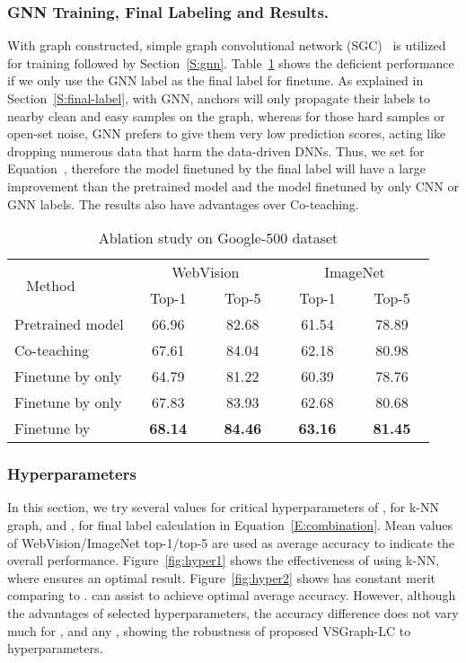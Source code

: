 \documentclass[sigconf]{acmart}
\begin{document}
\subsubsection{GNN Training, Final Labeling and Results.}
With graph  constructed, simple graph convolutional network (SGC)~\cite{wu2019simplifying} is utilized for training followed by Section~\ref{S:gnn}. Table~\ref{tab:google500} shows the deficient performance if we only use the GNN label as the final label for finetune. As explained in Section~\ref{S:final-label}, with GNN, anchors will only propagate their labels to nearby clean and easy samples on the graph, whereas for those hard samples or open-set noise, GNN prefers to give them very low prediction scores, acting like dropping numerous data that harm the data-driven DNNs. Thus, we set  for Equation~, therefore the model finetuned by the final label will have a large improvement than the pretrained model  and the model finetuned by only CNN or GNN labels. The results also have advantages over Co-teaching.

\setlength{\tabcolsep}{4pt}
\begin{table}
	\centering
	\caption{Ablation study on Google-500 dataset}
	\label{tab:google500}
	\begin{tabular}{lcccc}
		\toprule
		\multirow{2}{*}{~ Method}  & \multicolumn{2}{c}{ ~ WebVision ~ } & \multicolumn{2}{c}{ ~ ImageNet ~ } \\
		\multicolumn{1}{c}{} & \multicolumn{1}{c}{ ~ Top-1 ~ } & \multicolumn{1}{c}{ ~ Top-5 ~ } & \multicolumn{1}{c}{ ~ Top-1 ~ } & \multicolumn{1}{c}{ ~ Top-5 ~ } \\
		\midrule
		Pretrained model &66.96 &82.68&61.54 &78.89\\
		\midrule
		Co-teaching  & 67.61 & 84.04 & 62.18 & 80.98 \\
		\midrule
		Finetune by  only &64.79&81.22	&60.39&78.76\\
		Finetune by  only &67.83&83.93	&62.68&80.68\\
		Finetune by       &\textbf{68.14}&\textbf{84.46}&\textbf{63.16}&\textbf{81.45}\\
		\bottomrule
	\end{tabular}
\end{table}

\subsubsection{Hyperparameters}
\label{S:exp-hyper}
In this section, we try several values for critical hyperparameters of ,  for k-NN graph, and ,  for final label calculation in Equation~\ref{E:combination}. 
Mean values of WebVision/ImageNet top-1/top-5 are used as average accuracy to indicate the overall performance. Figure~\ref{fig:hyper1} shows the effectiveness of using k-NN, where  ensures an optimal result. Figure~\ref{fig:hyper2} shows  has constant merit comparing to .  can assist to achieve optimal average accuracy. 
However, although the advantages of selected hyperparameters, the accuracy difference does not vary much for ,  and any , showing the robustness of proposed VSGraph-LC to hyperparameters.
\end{document}
